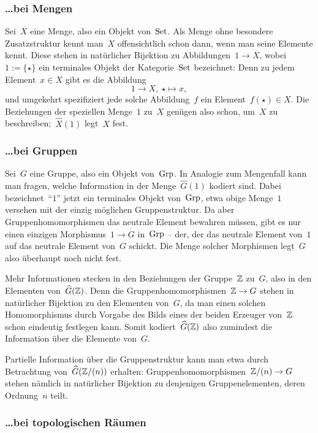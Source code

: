 \subsubsection*{\ldots bei Mengen}

Sei~$X$ eine Menge, also ein Objekt von~$\mathrm{Set}$. Als Menge ohne besondere
Zusatzstruktur kennt man~$X$ offensichtlich schon dann, wenn man seine Elemente
kennt. Diese stehen in natürlicher Bijektion zu Abbildungen~$1 \to X$, wobei~$1
:= \{ \star \}$ ein terminales Objekt der Kategorie~$\mathrm{Set}$ bezeichnet: Denn zu
jedem Element~$x \in X$ gibt es die Abbildung
\[ 1 \longrightarrow X,\ \star \longmapsto x, \]
und umgekehrt spezifiziert jede solche Abbildung~$f$ ein Element~$f(\star) \in X$.
Die Beziehungen der speziellen Menge~$1$ zu~$X$ genügen also schon, um~$X$ zu
beschreiben;~$\widehat X(1)$ legt~$X$ fest.


\subsubsection*{\ldots bei Gruppen}

Sei~$G$ eine Gruppe, also ein Objekt von~$\mathrm{Grp}$. In Analogie zum
Mengenfall kann man fragen, welche Information in der Menge~$\widehat G(1)$
kodiert sind. Dabei bezeichnet~"`$1$"' jetzt ein terminales Objekt von~$\mathrm{Grp}$,
etwa obige Menge~$1$ versehen mit der einzig möglichen Gruppenstruktur. Da aber
Gruppenhomomorphismen das neutrale Element bewahren müssen, gibt es nur einen
einzigen Morphismus~$1 \to G$ in~$\mathrm{Grp}$ -- der, der das neutrale Element von~$1$ auf das
neutrale Element von~$G$ schickt. Die Menge solcher Morphismen legt~$G$ also überhaupt
noch nicht fest.

Mehr Informationen stecken in den Beziehungen der Gruppe~$\mathbb{Z}$ zu~$G$, also in
den Elementen von~$\widehat G(\mathbb{Z})$. Denn die Gruppenhomomorphismen~$\mathbb{Z} \to G$
stehen in natürlicher Bijektion zu den Elementen von~$G$, da man einen solchen
Homomorphismus durch Vorgabe des Bilds eines der beiden Erzeuger von~$\mathbb{Z}$
schon eindeutig festlegen kann. Somit kodiert~$\widehat G(\mathbb{Z})$ also zumindest
die Information über die Elemente von~$G$.

Partielle Information über die Gruppenstruktur kann man etwa durch Betrachtung
von~$\widehat G(\mathbb{Z}/(n))$ erhalten: Gruppenhomomorphismen~$\mathbb{Z}/(n) \to G$
stehen nämlich in na\-tür\-li\-cher Bijektion zu denjenigen Gruppenelementen, deren
Ordnung~$n$ teilt.


\subsubsection*{\ldots bei topologischen Räumen}

